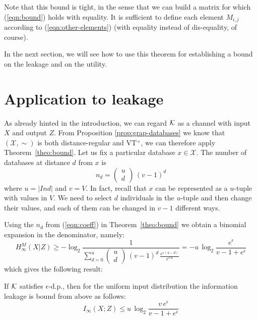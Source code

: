 \documentclass{llncs}
\newcommand{\calx}{\mathcal{X}}
\begin{document}
Note that this bound is tight, in the sense that we can build a matrix for which (\ref{eqn:bound}) holds with equality. 
It is sufficient to define each element $M_{i,j}$ according to (\ref{eqn:other-elements}) (with equality instead of dis-equality, of course). 

In the next section, we will see how to use this theorem for establishing a bound on the leakage and on the utility. 

\section{Application  to leakage}\label{section:leakage}
As already hinted in the introduction, we can regard $\cal K$ as a channel with input $X$ and output $Z$. 
From Proposition \ref{prop:grap-databases} we know that  $(\calx, \sim)$ is both distance-regular and VT$^+$, we can therefore apply Theorem~\ref{theo:bound}. 
Let us fix a particular  database $x\in \calx$. The number of databases at distance $d$ from $x$ is 
\begin{equation}\label{eqn:coeff} 
n_d =  \left(\begin{array}{c}u\\d\end{array}\right)\,(v-1)^{d}
\end{equation}
where $u=|\mathit{Ind}|$ and $v=\mathit{V}$. In fact, recall that $x$ 
can be represented as a $u$-tuple with values in $V$. 
We need to select $d$ individuals in the $u$-tuple and then change their values, and each of them can be changed  in $v-1$ different ways.  

Using the $n_d$ from (\ref{eqn:coeff}) in Theorem~\ref{theo:bound} we obtain a binomial expansion in the denominator, namely:
\[
H^{M}_\infty(X|Z) \geq - \log_2 \frac{1}{\displaystyle \sum_{d=0} ^u  \left(\begin{array}{c}u\\d\end{array} \right) \, (v-1)^{d} \,\frac{e^{\epsilon (u-d)}}{e^{\epsilon \, u}}} = 
- u \,\log_2\frac{e^{\epsilon}}{v-1+e^\epsilon}
\]
which gives the following result: 

\begin{theorem}
If $\cal K$ satisfies $\epsilon$-d.p., then for the uniform input distribution the information leakage is bound from above as follows: 
\[
I_\infty(X;Z)\leq  u\, \log_2\frac{v\,e^{\epsilon}}{v-1+e^\epsilon}
\]
\end{theorem}
\end{document}
